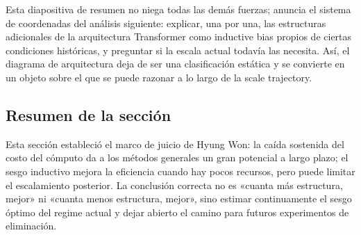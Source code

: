 Esta diapositiva de resumen no niega todas las demás fuerzas; anuncia el sistema de coordenadas del análisis siguiente: explicar, una por una, las estructuras adicionales de la arquitectura Transformer como inductive bias propios de ciertas condiciones históricas, y preguntar si la escala actual todavía las necesita. Así, el diagrama de arquitectura deja de ser una clasificación estática y se convierte en un objeto sobre el que se puede razonar a lo largo de la scale trajectory.

\subsection{Resumen de la sección}

Esta sección estableció el marco de juicio de Hyung Won: la caída sostenida del costo del cómputo da a los métodos generales un gran potencial a largo plazo; el sesgo inductivo mejora la eficiencia cuando hay pocos recursos, pero puede limitar el escalamiento posterior. La conclusión correcta no es «cuanta más estructura, mejor» ni «cuanta menos estructura, mejor», sino estimar continuamente el sesgo óptimo del regime actual y dejar abierto el camino para futuros experimentos de eliminación.
